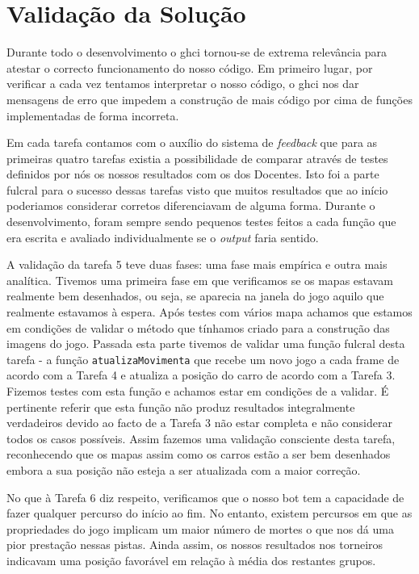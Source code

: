 \chapter{Validação da Solução}

Durante todo o desenvolvimento o ghci tornou-se de extrema relevância para
atestar o correcto funcionamento do nosso código. Em primeiro lugar, por
verificar a cada vez tentamos interpretar o nosso código, o ghci nos dar
mensagens de erro que impedem a construção de mais código por cima de funções
implementadas de forma incorreta.

Em cada tarefa contamos com o auxílio do sistema de \emph{feedback} que para
as primeiras quatro tarefas existia a possibilidade de comparar através de
testes definidos por nós os nossos resultados com os dos Docentes. Isto foi a
parte fulcral para o sucesso dessas tarefas visto que muitos resultados que ao
início poderiamos considerar corretos diferenciavam de alguma forma. Durante
o desenvolvimento, foram sempre sendo pequenos testes feitos a cada função que
era escrita e avaliado individualmente se o \emph{output} faria sentido.

A validação da tarefa 5 teve duas fases: uma fase mais empírica e outra mais
analítica. Tivemos uma primeira fase em que verificamos se os mapas estavam
realmente bem desenhados, ou seja, se aparecia na janela do jogo aquilo que
realmente estavamos à espera. Após testes com vários mapa achamos que estamos em
condições de validar o método que tínhamos criado para a construção das imagens
do jogo. Passada esta parte tivemos de validar uma função fulcral desta tarefa -
a função \texttt{atualizaMovimenta} que recebe um novo jogo a cada frame de
acordo com a Tarefa 4 e atualiza a posição do carro de acordo com a Tarefa 3.
Fizemos testes com esta função e achamos estar em condições de a validar. É
pertinente referir que esta função não produz resultados integralmente
verdadeiros devido ao facto de a Tarefa 3 não estar completa e não considerar
todos os casos possíveis. Assim fazemos uma validação consciente desta tarefa,
reconhecendo que os mapas assim como os carros estão a ser bem desenhados embora
a sua posição não esteja a ser atualizada com a maior correção.

No que à Tarefa 6 diz respeito, verificamos que o nosso bot tem a capacidade de
fazer qualquer percurso do início ao fim. No entanto, existem percursos em que
as propriedades do jogo implicam um maior número de mortes o que nos dá uma
pior prestação nessas pistas. Ainda assim, os nossos resultados nos torneiros
indicavam uma posição favorável em relação à média dos restantes grupos.
